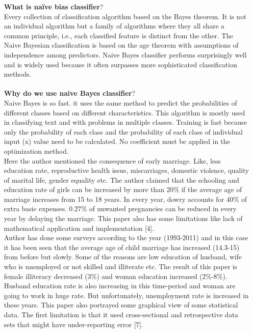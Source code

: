 \documentclass{article}
\begin{document}
    \textbf{What is naïve bias classifier}?\\
    Every collection of classification algorithm based on the Bayes theorem. It is not an individual algorithm but a family of algorithms where they all share a common principle, i.e., each classified feature is distinct from the other. The Naive Bayesian classification is based on the age theorem with assumptions of independence among predictors. Naive Bayes classifier performs surprisingly well and is widely used because it often surpasses more sophisticated classification methods.\\\\
    \textbf{Why do we use naive Bayes classifier}?\\
    Naive Bayes is so fast. it uses the same method to predict the probabilities of different classes based on different characteristics. This algorithm is mostly used in classifying text and with problems in multiple classes. Training is fast because only the probability of each class and the probability of each class of individual input (x) value need to be calculated. No coefficient must be applied in the optimization method.\\
    Here the author mentioned the consequence of early marriage. Like, less education rate, reproductive health issue, miscarriages, domestic violence, quality of marital life, gender equality etc. The author claimed that the schooling and education rate of girls can be increased by more than 20\% if the average age of marriage increases from 15 to 18 years. In every year, dowry accounts for 40\% of extra basic expenses. 0.27\% of unwanted pregnancies can be reduced in every year by delaying the marriage. This paper also has some limitations like lack of mathematical application and implementation [4].\\
    Author has done some surveys according to the year (1993-2011) and in this case it has been seen that the average age of child marriage has increased (14.3-15) from before but slowly. Some of the reasons are low education of husband, wife who is unemployed or not skilled and illiterate etc. The result of this paper is female illiteracy decreased (3\%) and woman education increased (2\%-8\%). Husband education rate is also increasing in this time-period and woman are going to work in huge rate. But unfortunately, unemployment rate is increased in these years. This paper also portrayed some graphical view of some statistical data. The first limitation is that it used cross-sectional and retrospective data sets that might have under-reporting error [7]. \\
\end{document}
